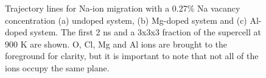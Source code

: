 \documentclass[12pt]{report}
\begin{document}
\begin{figure}[htbp]
\centering
    
    
    
\caption{Trajectory lines for Na-ion migration with a 0.27\% Na vacancy concentration (a) undoped system, (b) Mg-doped system and (c) Al-doped system. The first 2 ns and a 3x3x3 fraction of the supercell at 900 K are shown. O, Cl, Mg and Al ions are brought to the foreground for clarity, but it is important to note that not all of the ions occupy the same plane.}
\label{trajectories}
\end{figure}
\end{document}
